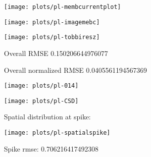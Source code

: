 \documentclass[10pt,a4paper]{report}
\begin{document}

\texttt{[image: plots/pl-membcurrentplot]}

\texttt{[image: plots/pl-imagemebc]}



\texttt{[image: plots/pl-tobbiresz]}



\begin{Schunk}
\begin{Soutput}
Overall RMSE 0.150206644976077
\end{Soutput}
\begin{Soutput}
Overall normalized RMSE 0.0405561194567369
\end{Soutput}
\end{Schunk}
\texttt{[image: plots/pl-014]}

\texttt{[image: plots/pl-CSD]}


Spatial distribution at spike:

\texttt{[image: plots/pl-spatialspike]}

\begin{Schunk}
\begin{Soutput}
Spike rmse: 0.706216417492308
\end{Soutput}
\end{Schunk}
\end{document}
